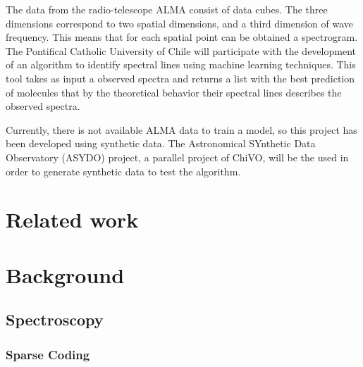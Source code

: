 \documentclass[twocolumn, draft]{emulateapj}
\begin{document}
The data from the radio-telescope ALMA consist of data cubes. The three dimensions correspond to two spatial dimensions, and a third dimension of wave frequency. This means that for each spatial point can be obtained a spectrogram.
The Pontifical Catholic University of Chile will participate with the development of an algorithm to identify spectral lines
using machine learning techniques. This tool takes as input a observed spectra and returns a list with the best prediction of
molecules that by the theoretical behavior their spectral lines describes the observed spectra.

Currently, there is not available ALMA data to train a model, so this project has been developed using synthetic data.
The Astronomical SYnthetic Data Observatory (ASYDO) project, a parallel project of ChiVO, will be the used in order to generate synthetic data to test the algorithm.

\section{Related work}
\label{sec:related}



\section{Background}
\label{sec:background}
\subsection{Spectroscopy}


\subsubsection{Sparse Coding}

\end{document}

